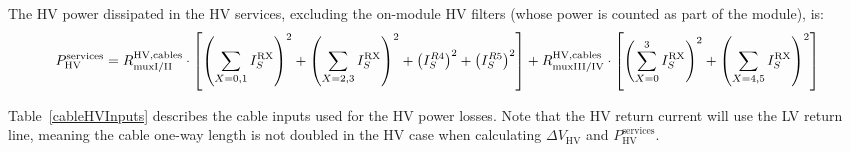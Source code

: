 The HV power dissipated in the HV services, excluding the on-module HV filters (whose power is counted
as part of the module), is:
\def\phvservices{P^\text{services}_\text{HV}}
\[
\phvservices = \rhvmuxI \cdot \left[ \left(\sum_{X=0,1} I^\text{RX}_S\right)^2
                                    +\left(\sum_{X=2,3} I^\text{RX}_S\right)^2
                                    +\left(I^{R4}_S\right)^2
                                    +\left(I^{R5}_S\right)^2
                                    \right]
               + \rhvmuxIII \cdot \left[ \left(\sum^3_{X=0} I^\text{RX}_S\right)^2
                                        +\left(\sum_{X=4,5} I^\text{RX}_S\right)^2
                                        \right]
\]

Table~\ref{cableHVInputs} describes the cable inputs used for the HV power losses.
Note that the HV return current will use the LV return line, meaning the cable one-way
length is not doubled in the HV case when calculating $\Delta V_\text{HV}$ and $\phvservices$.

